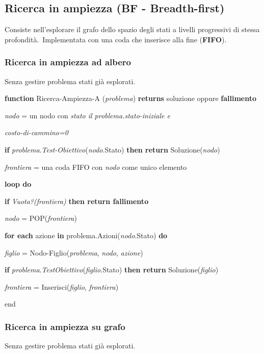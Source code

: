 \subsection{Ricerca in ampiezza (BF - Breadth-first)}
Consiste nell'esplorare il grafo dello spazio degli stati a livelli progressivi di stessa profondità.\
Implementata con una coda che inserisce alla fine (\textbf{FIFO}).\

\subsubsection{Ricerca in ampiezza ad albero}
Senza gestire problema stati già esplorati.

\begin{flushleft}
	\textbf{function} Ricerca-Ampiezza-A (\textit{problema}) \textbf{returns} soluzione oppure \textbf{fallimento}

	\quad \textit{nodo} = un nodo con \textit{stato il problema.stato-iniziale e}

	\qquad \textit{costo-di-cammino=0}

	\quad \textbf{if} \textit{problema}.\textit{Test-Obiettivo}(\textit{nodo}.Stato) \textbf{then return} Soluzione(\textit{nodo})

	\quad \textit{frontiera} = una coda FIFO con \textit{nodo} come unico elemento

	\quad \textbf{loop do}

	\quad \quad \textbf{if} \textit{Vuota?(frontiera)} \textbf{then return fallimento}

	\quad \quad \textit{nodo} = POP(\textit{frontiera})

	\quad \quad \textbf{for each} azione \textbf{in} problema.Azioni(\textit{nodo}.Stato) \textbf{do}

	\quad \qquad \textit{figlio} = Nodo-Figlio(\textit{problema}, \textit{nodo}, \textit{azione})

	\quad \qquad \textbf{if} \textit{problema}.\textit{TestObiettivo}(\textit{figlio}.Stato) \textbf{then return} Soluzione(\textit{figlio})

	\quad \qquad \textit{frontiera} = Inserisci(\textit{figlio}, \textit{frontiera})

	\quad \noindent end
\end{flushleft}

\subsubsection{Ricerca in ampiezza su grafo}
Senza gestire problema stati già esplorati.

